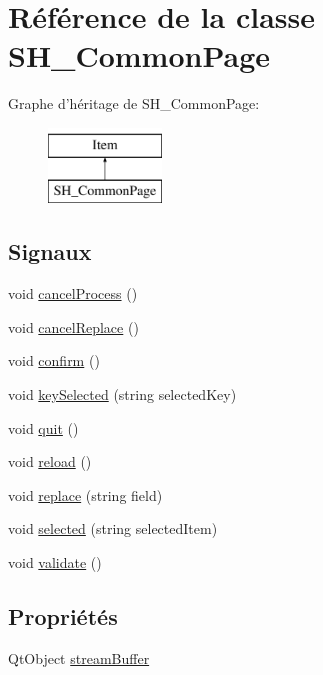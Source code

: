 \hypertarget{classSH__CommonPage}{\section{Référence de la classe S\-H\-\_\-\-Common\-Page}
\label{classSH__CommonPage}
}
Graphe d'héritage de S\-H\-\_\-\-Common\-Page\-:\begin{figure}[H]
\begin{center}
\leavevmode
\includegraphics[height=2.000000cm]{classSH__CommonPage}
\end{center}
\end{figure}
\subsection*{Signaux}
\begin{DoxyCompactItemize}
\item 
void \hyperlink{classSH__CommonPage_a500427619a33ea991ed173fa0ac3b446}{cancel\-Process} ()
\item 
void \hyperlink{classSH__CommonPage_a5b55fbe80e82ad1a7f06099680ba6595}{cancel\-Replace} ()
\item 
void \hyperlink{classSH__CommonPage_a66387106e42e843b3fd3ffbbcabbb8eb}{confirm} ()
\item 
void \hyperlink{classSH__CommonPage_a073e1151c7ac1c198931d77803d915d3}{key\-Selected} (string selected\-Key)
\item 
void \hyperlink{classSH__CommonPage_a5b15093af63a454ca459407ba1283038}{quit} ()
\item 
void \hyperlink{classSH__CommonPage_a548ff64a01793866cbef6485d1b23f7e}{reload} ()
\item 
void \hyperlink{classSH__CommonPage_a85adde41bfb4344268795d02a27c2e0c}{replace} (string field)
\item 
void \hyperlink{classSH__CommonPage_ab5af66b64fe452dc4e92e97f327ffba5}{selected} (string selected\-Item)
\item 
void \hyperlink{classSH__CommonPage_ad2a5e33acc0a2f0662d342ef44208cca}{validate} ()
\end{DoxyCompactItemize}
\subsection*{Propriétés}
\begin{DoxyCompactItemize}
\item 
Qt\-Object \hyperlink{classSH__CommonPage_af59ae18e73706e3622c000c2005d9550}{stream\-Buffer}
\end{DoxyCompactItemize}


